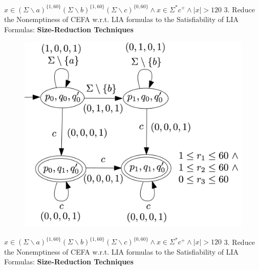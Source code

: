 \documentclass[landscape]{beamer}
\newcommand{\cB}{\mathcal{B}}
\begin{document}
\begin{frame}{$ x\in (\Sigma \backslash a)^{\{1,60\}}(\Sigma \backslash b)^{\{1,60\}}(\Sigma \backslash c)^{\{0,60\}} \wedge x\in \Sigma^*c^+ \wedge |x| > 120$}
  3. Reduce the Nonemptiness of CEFA w.r.t. LIA formulas to the Satisfiability of LIA Formulas: \textbf{Size-Reduction Techniques}
  \begin{figure}
    \includegraphics[width=.55\linewidth]{overview_product_vector.jpg}
  \end{figure}
\end{frame}

\begin{frame}[fragile]{$ x\in (\Sigma \backslash a)^{\{1,60\}}(\Sigma \backslash b)^{\{1,60\}}(\Sigma \backslash c)^{\{0,60\}} \wedge x\in \Sigma^*c^+ \wedge |x| > 120$}
  3. Reduce the Nonemptiness of CEFA w.r.t. LIA formulas to the Satisfiability of LIA Formulas: \textbf{Size-Reduction Techniques}
\end{frame}
\end{document}
